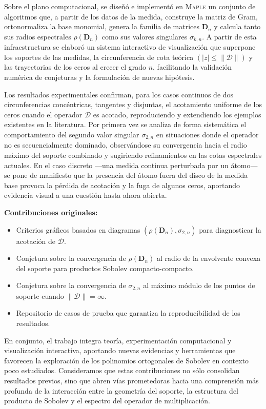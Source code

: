 Sobre el plano computacional, se diseñó e implementó en \textsc{Maple} un conjunto de algoritmos que, a partir de los datos de la medida, construye la matriz de Gram, ortonormaliza la base monomial, genera la familia de matrices \(\mathbf{D}_n\) y calcula tanto sus radios espectrales \(\rho(\mathbf{D}_n)\) como sus valores singulares \(\sigma_{k,n}\). A partir de esta infraestructura se elaboró un sistema interactivo de visualización que superpone los soportes de las medidas, la circunferencia de cota teórica \((|z|\le \|\mathcal{D}\|)\) y las trayectorias de los ceros al crecer el grado \(n\), facilitando la validación numérica de conjeturas y la formulación de nuevas hipótesis.

Los resultados experimentales confirman, para los casos continuos de dos circunferencias concéntricas, tangentes y disjuntas, el acotamiento uniforme de los ceros cuando el operador \(\mathcal{D}\) es acotado, reproduciendo y extendiendo los ejemplos existentes en la literatura. Por primera vez se analiza de forma sistemática el comportamiento del segundo valor singular \(\sigma_{2,n}\) en situaciones donde el operador no es secuencialmente dominado, observándose su convergencia hacia el radio máximo del soporte combinado y sugiriendo refinamientos en las cotas espectrales actuales. En el caso discreto —una medida continua perturbada por un átomo— se pone de manifiesto que la presencia del átomo fuera del disco de la medida base provoca la pérdida de acotación y la fuga de algunos ceros, aportando evidencia visual a una cuestión hasta ahora abierta.

\textbf{Contribuciones originales:}
\begin{itemize}
  \item Criterios gráficos basados en diagramas \((\rho(\mathbf{D}_n),\sigma_{2,n})\) para diagnosticar la acotación de \(\mathcal{D}\).
  \item Conjetura sobre la convergencia de \(\rho(\mathbf{D}_n)\) al radio de la envolvente convexa del soporte para productos Sobolev compacto-compacto.
  \item Conjetura sobre la convergencia de \(\sigma_{2,n}\) al máximo módulo de los puntos de soporte cuando \(\|\mathcal{D}\|=\infty\).
  \item Repositorio de casos de prueba que garantiza la reproducibilidad de los resultados.
\end{itemize}

En conjunto, el trabajo integra teoría, experimentación computacional y visualización interactiva, aportando nuevas evidencias y herramientas que favorecen la exploración de los polinomios ortogonales de Sobolev en contexto poco estudiados. Consideramos que estas contribuciones no sólo consolidan resultados previos, sino que abren vías prometedoras hacia una comprensión más profunda de la interacción entre la geometría del soporte, la estructura del producto de Sobolev y el espectro del operador de multiplicación.


